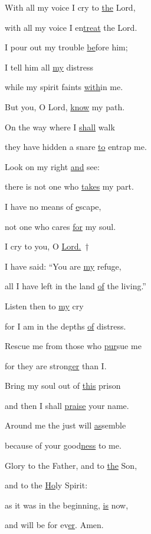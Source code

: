 \noindent With all my voice I cry to \uline{the} Lord,~\GreStar{}~\nopagebreak

with all my voice I en\uline{treat} the Lord.

\noindent I pour out my trouble \uline{be}fore him;~\GreStar{}~\nopagebreak

I tell him all \uline{my} distress

\noindent while my spirit faints \uline{with}in me.~\GreStar{}~\nopagebreak

But you, O Lord, \uline{know} my path.

\noindent On the way where I \uline{shall} walk~\GreStar{}~\nopagebreak

they have hidden a snare \uline{to} entrap me.

\noindent Look on my right \uline{and} see:~\GreStar{}~\nopagebreak

there is not one who \uline{takes} my part.

\noindent I have no means of \uline{e}scape,~\GreStar{}~\nopagebreak

not one who cares \uline{for} my soul.

\noindent I cry to you, O \uline{Lord.}~†~\nopagebreak

I have said: “You are \uline{my} refuge,~\GreStar{}~\nopagebreak

all I have left in the land \uline{of} the living.”

\noindent Listen then to \uline{my} cry~\GreStar{}~\nopagebreak

for I am in the depths \uline{of} distress.

\noindent Rescue me from those who \uline{pur}sue me~\GreStar{}~\nopagebreak

for they are strong\uline{er} than I.

\noindent Bring my soul out of \uline{this} prison~\GreStar{}~\nopagebreak

and then I shall \uline{praise} your name.

\noindent Around me the just will \uline{as}semble~\GreStar{}~\nopagebreak

because of your good\uline{ness} to me.

\noindent Glory to the Father, and to \uline{the} Son,~\GreStar{}~\nopagebreak

and to the \uline{Ho}ly Spirit:

\noindent as it was in the beginning, \uline{is} now,~\GreStar{}~\nopagebreak

and will be for ev\uline{er}. Amen.
